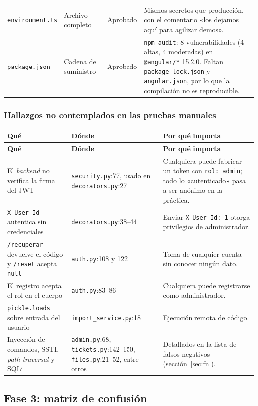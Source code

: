 \documentclass[11pt,letterpaper]{article}
\newcommand{\f}[1]{\texttt{#1}}
\newcommand{\enc}[1]{\textbf{#1}}
\begin{document}
\begin{small}
\begin{longtable}{p{3.2cm}p{2.3cm}p{2.3cm}p{7.4cm}}
\f{environment.ts} & Archivo completo & Aprobado & Mismos secretos que producción, con el comentario «los dejamos aquí para agilizar demos». \\
\f{package.json} & Cadena de suministro & Aprobado & \f{npm audit}: 8 vulnerabilidades (4 altas, 4 moderadas) en \f{@angular/*} 15.2.0. Faltan \f{package-lock.json} y \f{angular.json}, por lo que la compilación no es reproducible. \\
\end{longtable}
\end{small}

\subsubsection*{Hallazgos no contemplados en las pruebas manuales}

\begin{small}
\begin{longtable}{p{4.6cm}p{4cm}p{5.8cm}}
\toprule
\enc{Qué} & \enc{Dónde} & \enc{Por qué importa} \\
\midrule
\endfirsthead
\toprule
\enc{Qué} & \enc{Dónde} & \enc{Por qué importa} \\
\midrule
\endhead
\bottomrule
\endfoot
El \textit{backend} no verifica la firma del JWT & \f{security.py}:77, usado en \f{decorators.py}:27 & Cualquiera puede fabricar un token con \f{rol: admin}; todo lo «autenticado» pasa a ser anónimo en la práctica. \\
\f{X-User-Id} autentica sin credenciales & \f{decorators.py}:38--44 & Enviar \f{X-User-Id: 1} otorga privilegios de administrador. \\
\f{/recuperar} devuelve el código y \f{/reset} acepta \f{null} & \f{auth.py}:108 y 122 & Toma de cualquier cuenta sin conocer ningún dato. \\
El registro acepta el rol en el cuerpo & \f{auth.py}:83--86 & Cualquiera puede registrarse como administrador. \\
\f{pickle.loads} sobre entrada del usuario & \f{import\_service.py}:18 & Ejecución remota de código. \\
Inyección de comandos, SSTI, \textit{path traversal} y SQLi & \f{admin.py}:68, \f{tickets.py}:142--150, \f{files.py}:21--52, entre otros & Detallados en la lista de falsos negativos (sección~\ref{sec:fn}). \\
\end{longtable}
\end{small}

\subsection{Fase 3: matriz de confusión}
\end{document}
